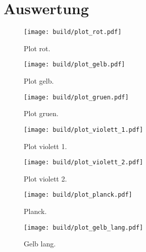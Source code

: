 \section{Auswertung}
\label{sec:Auswertung}

\begin{figure}
  \centering
  \texttt{[image: build/plot\_rot.pdf]}
  \caption{Plot rot.}
  \label{fig:plot_rot}
\end{figure}

\begin{figure}
  \centering
  \texttt{[image: build/plot\_gelb.pdf]}
  \caption{Plot gelb.}
  \label{fig:plot_gelb}
\end{figure}

\begin{figure}
  \centering
  \texttt{[image: build/plot\_gruen.pdf]}
  \caption{Plot gruen.}
  \label{fig:plot_gruen}
\end{figure}

\begin{figure}
  \centering
  \texttt{[image: build/plot\_violett\_1.pdf]}
  \caption{Plot violett 1.}
  \label{fig:plot_violett_1}
\end{figure}

\begin{figure}
  \centering
  \texttt{[image: build/plot\_violett\_2.pdf]}
  \caption{Plot violett 2.}
  \label{fig:plot_violett_2}
\end{figure}

\begin{figure}
  \centering
  \texttt{[image: build/plot\_planck.pdf]}
  \caption{Planck.}
  \label{fig:planck}
\end{figure}

\begin{figure}
  \centering
  \texttt{[image: build/plot\_gelb\_lang.pdf]}
  \caption{Gelb lang.}
  \label{fig:gelb_lang}
\end{figure}